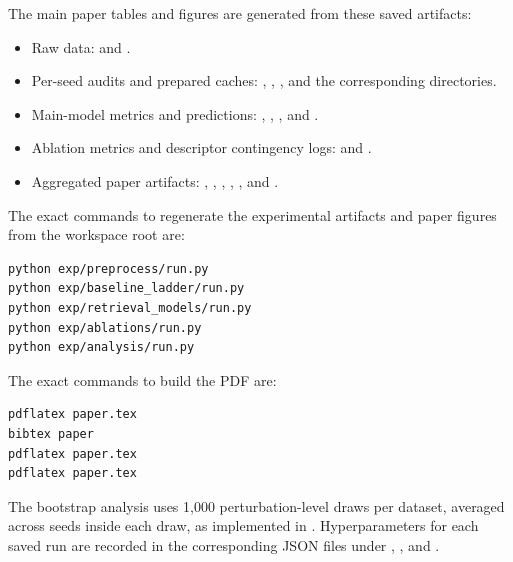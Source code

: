 \documentclass{article}
\begin{document}
The main paper tables and figures are generated from these saved artifacts:
\begin{itemize}
  \item Raw data:  and .
  \item Per-seed audits and prepared caches: , , , and the corresponding  directories.
  \item Main-model metrics and predictions: , , , and .
  \item Ablation metrics and descriptor contingency logs:  and .
  \item Aggregated paper artifacts: , , , , , and .
\end{itemize}

The exact commands to regenerate the experimental artifacts and paper figures from the workspace root are:
\begin{verbatim}
python exp/preprocess/run.py
python exp/baseline_ladder/run.py
python exp/retrieval_models/run.py
python exp/ablations/run.py
python exp/analysis/run.py
\end{verbatim}
The exact commands to build the PDF are:
\begin{verbatim}
pdflatex paper.tex
bibtex paper
pdflatex paper.tex
pdflatex paper.tex
\end{verbatim}
The bootstrap analysis uses 1{,}000 perturbation-level draws per dataset, averaged across seeds inside each draw, as implemented in . Hyperparameters for each saved run are recorded in the corresponding JSON files under , , and .



\end{document}
